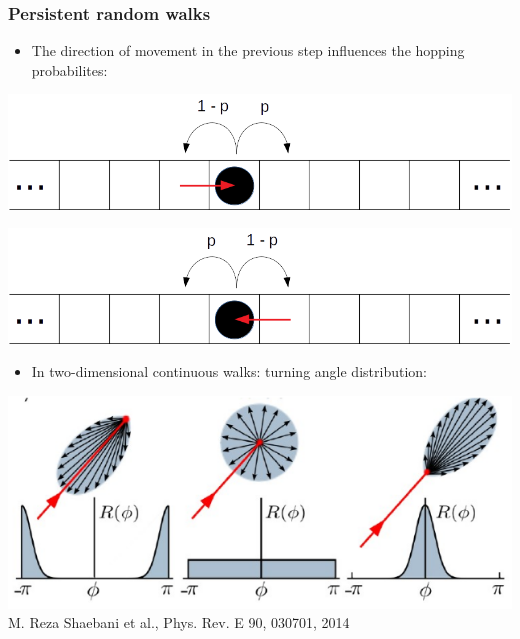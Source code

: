 \documentclass[11pt]{beamer}
\begin{document}
\begin{frame}
 \frametitle{Persistent random walks}
 
 \begin{itemize}
  \item The direction of movement in the previous step influences the hopping probabilites:
 \end{itemize}
 \begin{minipage}[h]{0.49\linewidth}
  \centering
  \includegraphics[width=0.9\linewidth]{gfx/1D-PRWright.png}
 \end{minipage}
 \begin{minipage}[h]{0.49\linewidth}
  \centering
  \includegraphics[width=0.9\linewidth]{gfx/1D-PRWleft.png}
 \end{minipage}
 \vspace{1cm}
 \begin{itemize}
  \item In two-dimensional continuous walks: turning angle distribution:
 \end{itemize}
 \begin{center}
  \includegraphics[width=0.6\linewidth]{gfx/turningAngleDistribution.png}
  {\newline\tiny M. Reza Shaebani et al., Phys. Rev. E 90, 030701, 2014}
 \end{center}

\end{frame}
\end{document}
